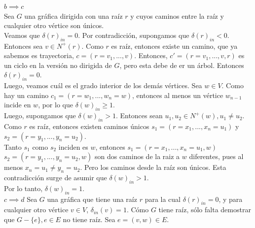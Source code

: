 \documentclass[12pt,a4paper]{report}
\begin{document}
\begin{enumerate}
{			$b \implies c$\\
			Sea $G$ una gráfica dirigida con una raíz $r$ y cuyos caminos entre la raíz y
			cualquier otro vértice son únicos.\\
			Veamos que $\delta(r)_{in} = 0$. Por contradicción, supongamos que
			$\delta(r)_{in} < 0$. Entonces sea $v \in N^+(r)$. Como $r$ es raíz,
			entonces existe un camino, que ya sabemos es trayectoria,
			$c = (r = v_1, ..., v)$. Entonces, $c' = (r = v_1, ..., v, r)$ es un
			ciclo en la versión no dirigida de $G$, pero esta debe de er un árbol.
			Entonces $\delta(r)_{in} = 0$.\\
			Luego, veamos cuál es el grado interior de los demás vértices.
			Sea $w \in V$. Como hay un camino $c_1 = (r = w_1, ..., w_n = w)$,
			entonces al menos un vértice $w_{n-1}$ incide en $w$, por lo que
			$\delta(w)_{in} \geq 1$.\\
			Luego, supongamos que $\delta(w)_{in} > 1$. Entonces sean
			 $u_1, u_2 \in N^+(w), u_1 \neq u_2$.\\
			Como $r$ es raíz, entonces existen caminos únicos $s_1 = (r = x_1, ..., x_n = u_1)$
			y $s_2 = (r = y_1, ..., y_n = u_2)$.\\
			Tanto $s_1$ como  $s_2$ inciden es $w$, entonces
			$s_1 = (r = x_1, ..., x_n = u_1, w)$ $s_2 = (r = y_1, ..., y_n = u_2, w)$
			son dos caminos de la raiz a $w$ diferentes, pues al menos $x_n = u_1 \neq y_n = u_2$.
			Pero los caminos desde la raíz son únicos. Esta contradicción surge de
			asumir que $\delta(w)_{in} > 1$.\\
			Por lo tanto, $\delta(w)_{in} = 1$.\\

			$c \implies d$
			Sea $G$ una gráfica que tiene una raíz $r$ para la cual $\delta(r)_{in} = 0$,
			y para cualquier otro vértice  $v \in V$, $\delta_{in}(v) = 1$.
			Cómo $G$ tiene raíz, sólo falta demostrar que $G-\{e\}, e \in E$ no tiene
			raíz.
			Sea $e = (v, w) \in E$.
		}
	\end{enumerate}
\end{document}
